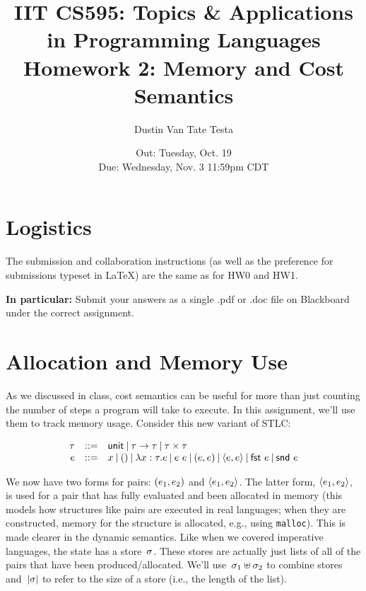 \documentclass{article}
\title{IIT CS595: Topics \& Applications in Programming Languages\\
  {\large Homework 2: Memory and Cost Semantics}}
\author{Dustin Van Tate Testa}
\date{Out: Tuesday, Oct. 19\\
  Due: Wednesday, Nov. 3 11:59pm CDT\\
}
\begin{document}
\maketitle



\section*{Logistics}
The submission and collaboration instructions (as well as the preference
for submissions typeset in LaTeX) are the same as for HW0 and HW1.

\textbf{In particular:}
Submit your answers as a single .pdf or .doc file  on Blackboard
under
the correct assignment. 

\section{Allocation and Memory Use}

As we discussed in class, cost semantics can be useful for more than just
counting the number of steps a program will take to execute.
%
In this assignment, we'll use them to track memory usage.
%
Consider this new variant of STLC:

\[
\begin{array}{r l l}
  \tau & \mathop{::=} & \mathsf{unit} \mathbin{|}
  \tau \rightarrow \tau \mathbin{|}
  \tau \times \tau\\
  e & \mathop{::=} & x \mathbin{|}
  \mathsf{()} \mathbin{|}
  \lambda x : \tau. e \mathbin{|}
  e~e \mathbin{|}
  (e, e) \mathbin{|}
  \langle e, e \rangle \mathbin{|}
  \mathsf{fst}~e \mathbin{|}
  \mathsf{snd}~e\\
\end{array}
\]

We now have two forms for pairs: $(e_1, e_2)$ and $\langle e_1, e_2 \rangle$.
The latter form, $\langle e_1, e_2 \rangle$, is used for a pair that has fully
evaluated and been allocated in memory (this models how structures like pairs
are executed in real languages; when they are constructed, memory for the
structure is allocated, e.g., using \texttt{malloc}).
%
This is made clearer in the dynamic semantics.
%
Like when we covered imperative languages, the state has a store~$\sigma$.
%
These stores are actually just lists of all of the pairs that have been
produced/allocated.
%
We'll use~$\sigma_1 \uplus \sigma_2$ to combine stores
and~$|\sigma|$ to refer to the size of a store (i.e., the length of the list).
\end{document}

